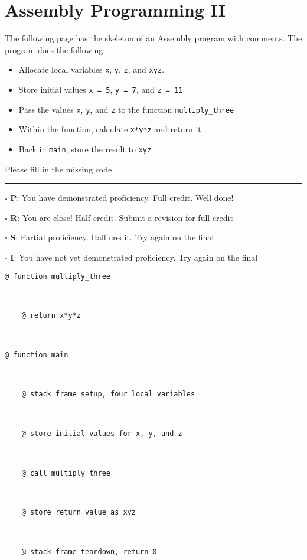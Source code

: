\documentclass[12pt]{article}
\begin{document}
\newpage

\section*{Assembly Programming II}


The following page has the skeleton of an Assembly program with comments. The program does the following:
\begin{itemize}
    \item Allocate local variables \texttt{x}, \texttt{y}, \texttt{z}, and \texttt{xyz}.
    \item Store initial values \texttt{x = 5}, \texttt{y = 7}, and \texttt{z = 11}
    \item Pass the values \texttt{x}, \texttt{y}, and \texttt{z} to the function \texttt{multiply\_three}
    \item Within the function, calculate \texttt{x*y*z} and return it
    \item Back in \texttt{main}, store the result to \texttt{xyz}
\end{itemize}

Please fill in the missing code

\vfill

\rule[1ex]{\textwidth}{.1pt}

$\square$ \textbf{P}: You have demonstrated proficiency. Full credit. Well done!

$\square$ \textbf{R}: You are close! Half credit. Submit a revision for full credit

$\square$ \textbf{S}: Partial proficiency. Half credit. Try again on the final

$\square$ \textbf{I}: You have not yet demonstrated proficiency. Try again on the final

\newpage

\begin{verbatim}
@ function multiply_three



    @ return x*y*z



@ function main


    
    @ stack frame setup, four local variables



    @ store initial values for x, y, and z



    @ call multiply_three



    @ store return value as xyz



    @ stack frame teardown, return 0



\end{verbatim}
\end{document}
